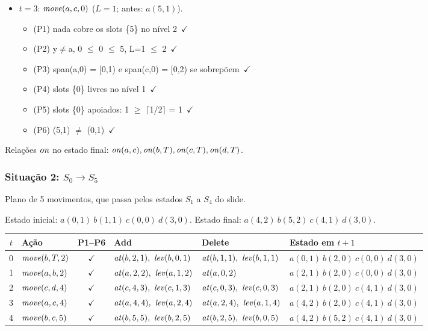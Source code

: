 \begin{itemize}
\begin{itemize}
\end{itemize}
\item $t=3$: $\mathit{move}(a,c,0)$ ($L=1$; antes: $a(5,1)$).
\begin{itemize}
\item (P1) nada cobre os slots \{5\} no nível 2\ $\checkmark$
\item (P2) y$\neq$a, 0 $\le$ 0 $\le$ 5, L=1 $\le$ 2\ $\checkmark$
\item (P3) span(a,0) = [0,1) e span(c,0) = [0,2) se sobrepõem\ $\checkmark$
\item (P4) slots \{0\} livres no nível 1\ $\checkmark$
\item (P5) slots \{0\} apoiados: 1 $\ge$ $\lceil$1/2$\rceil$ = 1\ $\checkmark$
\item (P6) (5,1) $\neq$ (0,1)\ $\checkmark$
\end{itemize}
\end{itemize}
Relações $\mathit{on}$ no estado final: $\mathit{on}(a,c), \mathit{on}(b,T), \mathit{on}(c,T), \mathit{on}(d,T)$.

\subsubsection{Situação 2: $S_0\to S_5$}
Plano de 5 movimentos, que passa pelos estados $S_1$ a $S_4$ do slide.

Estado inicial: $a(0,1)\ b(1,1)\ c(0,0)\ d(3,0)$. Estado final: $a(4,2)\ b(5,2)\ c(4,1)\ d(3,0)$.

\begin{longtable}{c p{2.6cm} c p{3.4cm} p{3.4cm} p{3.6cm}}
\toprule $t$ & Ação & P1--P6 & Add & Delete & Estado em $t+1$ \\ \midrule \endhead
0 & $\mathit{move}(b,T,2)$ & $\checkmark$ & $\At(b,2,1),\ \Lev(b,0,1)$ & $\At(b,1,1),\ \Lev(b,1,1)$ & $a(0,1)\ b(2,0)\ c(0,0)\ d(3,0)$ \\
1 & $\mathit{move}(a,b,2)$ & $\checkmark$ & $\At(a,2,2),\ \Lev(a,1,2)$ & $\mathit{at}(a,0,2)$ & $a(2,1)\ b(2,0)\ c(0,0)\ d(3,0)$ \\
2 & $\mathit{move}(c,d,4)$ & $\checkmark$ & $\At(c,4,3),\ \Lev(c,1,3)$ & $\At(c,0,3),\ \Lev(c,0,3)$ & $a(2,1)\ b(2,0)\ c(4,1)\ d(3,0)$ \\
3 & $\mathit{move}(a,c,4)$ & $\checkmark$ & $\At(a,4,4),\ \Lev(a,2,4)$ & $\At(a,2,4),\ \Lev(a,1,4)$ & $a(4,2)\ b(2,0)\ c(4,1)\ d(3,0)$ \\
4 & $\mathit{move}(b,c,5)$ & $\checkmark$ & $\At(b,5,5),\ \Lev(b,2,5)$ & $\At(b,2,5),\ \Lev(b,0,5)$ & $a(4,2)\ b(5,2)\ c(4,1)\ d(3,0)$ \\
\bottomrule \end{longtable}

